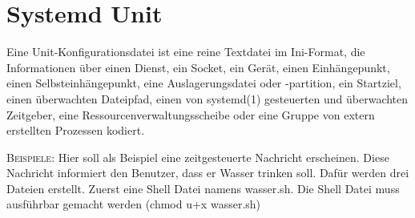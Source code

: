 \documentclass{sajzk}
\begin{document}
\section{Systemd Unit}
\label{okzh}

Eine Unit-Konfigurationsdatei ist eine reine Textdatei im Ini-Format, die
Informationen über einen Dienst, ein Socket, ein Gerät, einen Einhängepunkt,
einen Selbsteinhängepunkt, eine Auslagerungsdatei oder -partition, ein
Startziel, einen überwachten Dateipfad, einen von systemd(1) gesteuerten und
überwachten Zeitgeber, eine Ressourcenverwaltungsscheibe oder eine Gruppe von
extern erstellten Prozessen kodiert.

\textsc{Beispiele:}
Hier soll als Beispiel eine zeitgesteuerte Nachricht erscheinen. Diese
Nachricht informiert den Benutzer, dass er Wasser trinken soll. Dafür werden
drei Dateien erstellt. Zuerst eine Shell Datei namens wasser.sh. Die Shell
Datei muss ausführbar gemacht werden (chmod u+x wasser.sh)
\end{document}
